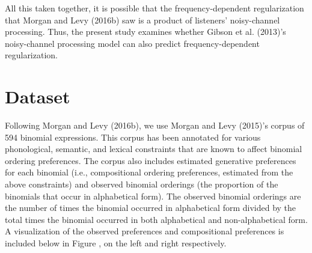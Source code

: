 \documentclass[
  jou,floatsintext]{apa6}
\begin{document}
All this taken together, it is possible that the frequency-dependent regularization that Morgan and Levy (2016b) saw is a product of listeners' noisy-channel processing. Thus, the present study examines whether Gibson et al. (2013)'s noisy-channel processing model can also predict frequency-dependent regularization.

\section{Dataset}\label{dataset}

Following Morgan and Levy (2016b), we use Morgan and Levy (2015)'s corpus of 594 binomial expressions. This corpus has been annotated for various phonological, semantic, and lexical constraints that are known to affect binomial ordering preferences. The corpus also includes estimated generative preferences for each binomial (i.e., compositional ordering preferences, estimated from the above constraints) and observed binomial orderings (the proportion of the binomials that occur in alphabetical form). The observed binomial orderings are the number of times the binomial occurred in alphabetical form divided by the total times the binomial occurred in both alphabetical and non-alphabetical form. A visualization of the observed preferences and compositional preferences is included below in Figure , on the left and right respectively.
\end{document}
